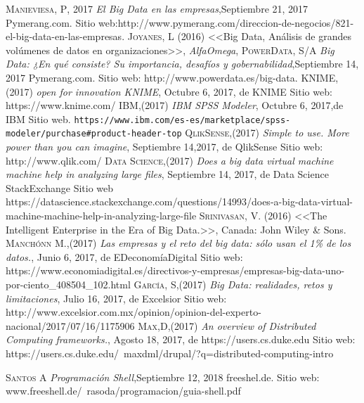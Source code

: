 \begin{thebibliography}{}
	 \textsc{Manieviesa, P}, 2017
	\textit{El Big Data en las empresas},Septiembre 21, 2017 Pymerang.com. Sitio web:http://www.pymerang.com/direccion-de-negocios/821-el-big-data-en-las-empresas.
	 \textsc{Joyanes, L} (2016)
	<<Big Data, Análisis de grandes volúmenes de datos en organizaciones>>,
	\textit{AlfaOmega},
	 \textsc{PowerData}, S/A
	\textit{Big Data: ¿En qué consiste? Su importancia, desafíos y gobernabilidad},Septiembre 14, 2017 Pymerang.com. Sitio web: http://www.powerdata.es/big-data.
	 \textsc{KNIME}, (2017)
	\textit{open for innovation KNIME}, Octubre 6, 2017, de KNIME Sitio web: https://www.knime.com/	
	 \textsc{IBM},(2017)
	\textit{IBM SPSS Modeler}, Octubre 6, 2017,de IBM Sitio web. 	
	\texttt{https://www.ibm.com/es-es/marketplace/spss-modeler/purchase\#product-header-top}
	 \textsc{QlikSense},(2017)
	\textit{ Simple to use. More power than you can imagine}, Septiembre 14,2017, de 	QlikSense Sitio web: http://www.qlik.com/	
	 \textsc{Data Science},(2017)
	\textit{Does a big data virtual machine machine help in analyzing large files}, Septiembre 14, 2017, de Data Science StackExchange Sitio web https://datascience.stackexchange.com/questions/14993/does-a-big-data-virtual-machine-machine-help-in-analyzing-large-file	
	 \textsc{Srinivasan, V.} (2016)
	<<The Intelligent Enterprise in the Era of Big Data.>>,
	Canada: John Wiley \& Sons.
	 \textsc{Manchónn M.},(2017)
	\textit{ Las empresas y el reto del big data: sólo usan el 1\% de los datos.},  Junio 6, 2017, de EDeconomíaDigital
	Sitio web: https://www.economiadigital.es/directivos-y-empresas/empresas-big-data-uno-por-ciento\_408504\_102.html
	 \textsc{García, S},(2017)
	\textit{Big Data: realidades, retos y limitaciones}, Julio 16, 2017, de Excelsior Sitio web:
	http://www.excelsior.com.mx/opinion/opinion-del-experto-nacional/2017/07/16/1175906	
	 \textsc{Max,D},(2017)
	\textit{ An overview of Distributed Computing frameworks.}, Agosto 18, 2017, de https://users.cs.duke.edu Sitio web:
	https://users.cs.duke.edu/~maxdml/drupal/?q=distributed-computing-intro

	
	 \textsc{Santos A}
	\textit{Programación Shell},Septiembre 12, 2018 freeshel.de. Sitio web: www.freeshell.de/~rasoda/programacion/guia-shell.pdf

\end{thebibliography}
